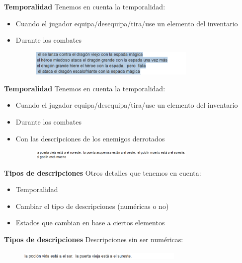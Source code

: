 \begin{tframe}{\textbf{Temporalidad}}
	Tenemos en cuenta la temporalidad:
	\begin{itemize}
		\item Cuando el jugador equipa/desequipa/tira/use un elemento del inventario
		\item<+-| alert@+> Durante los combates
		\begin{figure}[h]
			\includegraphics[width=8cm]{../img/temporalidadAtaque.PNG}
		\end{figure}
	\end{itemize}
\end{tframe}

\begin{tframe}{\textbf{Temporalidad}}
	Tenemos en cuenta la temporalidad:
	\begin{itemize}
		\item Cuando el jugador equipa/desequipa/tira/use un elemento del inventario
		\item Durante los combates
		\item<+-| alert@+> Con las descripciones de los enemigos derrotados
		\begin{figure}[h]
			\includegraphics[width=8cm]{../img/enemigosderrotados.PNG}
		\end{figure}
	\end{itemize}
\end{tframe}


\begin{tframe}{\textbf{Tipos de descripciones}}
	Otros detalles que tenemos en cuenta:
	\begin{itemize}
		\item Temporalidad
		\item<+-| alert@+> Cambiar el tipo de descripciones (numéricas o no)
		\item Estados que cambian en base a ciertos elementos
	\end{itemize}
\end{tframe}

\begin{tframe}{\textbf{Tipos de descripciones}}
	Descripciones sin ser numéricas:
		\begin{figure}[h]
			\includegraphics[width=8cm]{../img/descripcionnonumerica.PNG}
		\end{figure}
\end{tframe}


